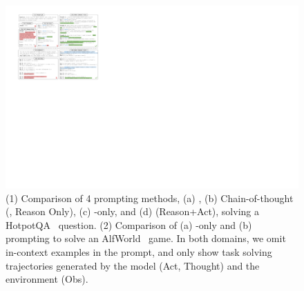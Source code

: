 \begin{figure}[t]
    \centering
    \includegraphics[width=\textwidth]{iclr2023/figure/teaser-new.pdf}
    \caption{(1) Comparison of 4 prompting methods, (a) \palm{}, (b) Chain-of-thought (\reason{}, Reason Only), (c) \act{}-only, and (d) \model{} (Reason+Act), solving a HotpotQA~\citep{yang2018hotpotqa} question. 
    (2) Comparison of (a) \act{}-only and (b) \model{} prompting to solve an AlfWorld~\citep{shridhar2020alfworld} game. 
    In both domains, we omit in-context examples in the prompt, and only show task solving trajectories generated by the model (Act, Thought) and the environment (Obs).
}
    \label{fig:teaser}
    \vspace{-10pt}
\end{figure}
